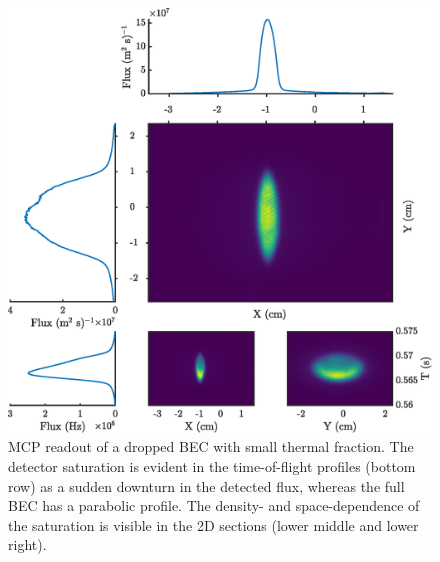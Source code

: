 
		 \newpage
	 \begin{figure}
	 	\centering
	 	\includegraphics[width=\textwidth]{fig/apparatus/dropped_bec}
	 	\caption{MCP readout of a dropped BEC with small thermal fraction.
	The detector saturation is evident in the time-of-flight profiles (bottom row) as a sudden downturn in the detected flux, whereas the full BEC has a parabolic profile.
	The density- and space-dependence of the saturation is visible in the 2D sections (lower middle and lower right).}
	 	\label{fig:dropped_bec}
	 \end{figure}

